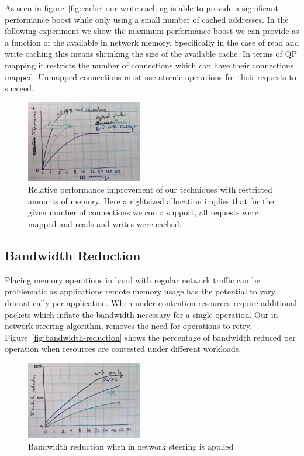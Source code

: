As seen in figure~\ref{fig:cache} our write caching is able to provide a
significant performance boost while only using a small number of cached
addresses. In the following experiment we show the maximum performance boost we
can provide as a function of the available in network memory. Specifically in
the case of read and write caching this means shrinking the size of the
available cache. In terms of QP mapping it restricts the number of connections
which can have their connections mapped. Unmapped connections must use atomic
operations for their requests to succeed.

\begin{figure}
    \includegraphics[width=0.45\textwidth]{fig/memory_util.jpg}
    \caption{{Relative performance improvement of our techniques with restricted amounts of memory. Here a rightsized allocation implies that for the given number of connections we could support, all requests were mapped and reads and writes were cached.}}
    \label{fig:memory_util}
\end{figure}



\subsection{Bandwidth Reduction}

Placing memory operations in band with regular network traffic can be
problematic as applications remote memory usage has the potential to vary
dramatically per application. When under contention resources require additional
packets which inflate the bandwidth necessary for a single operation. Our in
network steering algorithm, removes the need for operations to retry.
Figure~\ref{fig:bandwidth-reduction} shows the percentage of bandwidth reduced
per operation when resources are contested under different workloads.

\begin{figure}
    \includegraphics[width=0.45\textwidth]{fig/bandwidth_reduction.jpg}
    \caption{{Bandwidth reduction when in network steering is applied}}
    \label{fig:bandwidth_reduction}
\end{figure}

